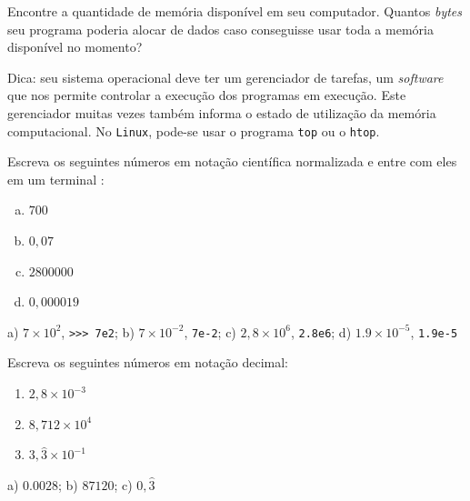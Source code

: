 \begin{exer}
  Encontre a quantidade de memória disponível em seu computador. Quantos \textit{bytes} seu programa poderia alocar de dados caso conseguisse usar toda a memória disponível no momento?
\end{exer}
\begin{resp}
  Dica: seu sistema operacional deve ter um gerenciador de tarefas, um \textit{software} que nos permite controlar a execução dos programas em execução. Este gerenciador muitas vezes também informa o estado de utilização da memória computacional. No \lstinline+Linux+, pode-se usar o programa \lstinline+top+ ou o \lstinline+htop+.
\end{resp}

\begin{exer}
  Escreva os seguintes números em notação científica normalizada e entre com eles em um terminal {\python}:
  \begin{enumerate}[a)]
  \item $700$
  \item $0,07$
  \item $2800000$
  \item $0,000019$
  \end{enumerate}
\end{exer}
\begin{resp}
  a) $7\times 10^2$, \lstinline+>>> 7e2+; b) $7\times 10^{-2}$, \lstinline+7e-2+; c) $2,8\times 10^6$, \lstinline+2.8e6+; d) $1.9\times 10^{-5}$, \lstinline+1.9e-5+
\end{resp}

\begin{exer}
  Escreva os seguintes números em notação decimal:
  \begin{enumerate}
  \item $2,8\times 10^{-3}$
  \item $8,712\times 10^4$
  \item $3,\hat{3}\times 10^{-1}$
  \end{enumerate}
\end{exer}
\begin{resp}
  a) $0.0028$; b) $87120$; c) $0,\hat{3}$
\end{resp}


